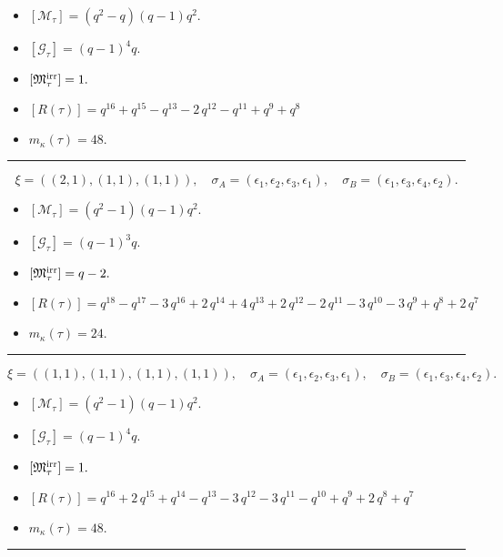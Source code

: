 \documentclass[10pt,a4paper]{amsart}
\begin{document}
\begin{itemize}
 \item $[\mathcal{M}_{\tau}] = {\left(q^{2} - q\right)} {\left(q - 1\right)} q^{2} .$

 \item $[\mathcal{G}_{\tau}] = {\left(q - 1\right)}^{4} q .$

 \item $[{\frak M}_{\tau}^{\textrm{irr}}] = 1 .$

 \item $[R(\tau)] = q^{16} + q^{15} - q^{13} - 2 \, q^{12} - q^{11} + q^{9} + q^{8} $

 \item $m_{\kappa}(\tau) = 48 .$

 \end{itemize}
\noindent\rule{8cm}{0.4pt}

$$\xi = ({(2, 1)}, {(1, 1)}, {(1, 1)}),\quad \sigma_A = ({{\epsilon_1, \epsilon_2}}, {{\epsilon_3}}, {{\epsilon_1}}),\quad \sigma_B = ({{\epsilon_1, \epsilon_3}}, {{\epsilon_4}}, {{\epsilon_2}}).$$

\begin{itemize}
 \item $[\mathcal{M}_{\tau}] = {\left(q^{2} - 1\right)} {\left(q - 1\right)} q^{2} .$

 \item $[\mathcal{G}_{\tau}] = {\left(q - 1\right)}^{3} q .$

 \item $[{\frak M}_{\tau}^{\textrm{irr}}] = q - 2 .$

 \item $[R(\tau)] = q^{18} - q^{17} - 3 \, q^{16} + 2 \, q^{14} + 4 \, q^{13} + 2 \, q^{12} - 2 \, q^{11} - 3 \, q^{10} - 3 \, q^{9} + q^{8} + 2 \, q^{7} $

 \item $m_{\kappa}(\tau) = 24 .$

 \end{itemize}
\noindent\rule{8cm}{0.4pt}

$$\xi = ({(1, 1), (1, 1)}, {(1, 1)}, {(1, 1)}),\quad \sigma_A = ({{\epsilon_1}, {\epsilon_2}}, {{\epsilon_3}}, {{\epsilon_1}}),\quad \sigma_B = ({{\epsilon_1}, {\epsilon_3}}, {{\epsilon_4}}, {{\epsilon_2}}).$$

\begin{itemize}
 \item $[\mathcal{M}_{\tau}] = {\left(q^{2} - 1\right)} {\left(q - 1\right)} q^{2} .$

 \item $[\mathcal{G}_{\tau}] = {\left(q - 1\right)}^{4} q .$

 \item $[{\frak M}_{\tau}^{\textrm{irr}}] = 1 .$

 \item $[R(\tau)] = q^{16} + 2 \, q^{15} + q^{14} - q^{13} - 3 \, q^{12} - 3 \, q^{11} - q^{10} + q^{9} + 2 \, q^{8} + q^{7} $

 \item $m_{\kappa}(\tau) = 48 .$

 \end{itemize}
\noindent\rule{8cm}{0.4pt}
\end{document}
